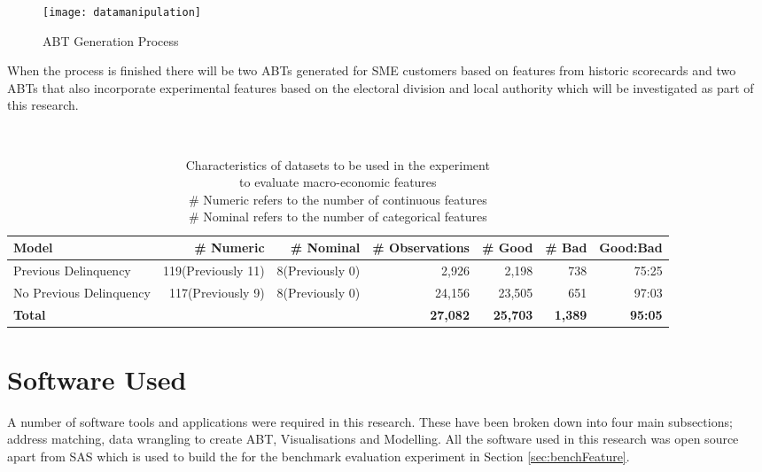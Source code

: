 \begin{figure}[H]
	\texttt{[image: datamanipulation]}
	\caption{ABT Generation Process}
	\label{fig:datamanipulation}
\end{figure}

When the process is finished there will be two ABTs generated for SME customers based on features from historic scorecards and two ABTs that also incorporate experimental features based on the electoral division and local authority which will be investigated as part of this research.

\begin{table}[H]
	\centering\
	\resizebox{\textwidth}{!}
	{
		\begin{tabular}{l r r r r r r}
			\hline
			\textbf{Model} &  \textbf{\# Numeric} & \textbf{\# Nominal} & \textbf{\# Observations} & \textbf{\# Good} & \textbf{\# Bad} & \textbf{Good:Bad}\\
			\hline
			Previous Delinquency & 119(Previously 11) & 8(Previously 0) & 2,926 & 2,198  & 738 & 75:25 \\ 
			No Previous Delinquency & 117(Previously 9)  & 8(Previously 0) & 24,156 & 23,505 & 651  & 97:03 \\ \hline
			\textbf{Total} &  &  & \textbf{27,082} & \textbf{25,703} & \textbf{1,389} & \textbf{95:05} \\ \hline
		\end{tabular}
	}
	\caption{Characteristics of datasets to be used in the experiment \\to evaluate macro-economic features \\
		\# Numeric refers to the number of continuous features \\
		\# Nominal refers to the number of categorical features
	}
	\label{characteristicsMacroDatasets}
\end{table}

\section{Software Used}\label{chp3:softwareUsed}
A number of software tools and applications were required in this research. These have been broken down into four main subsections; address matching, data wrangling to create ABT, Visualisations and Modelling. All the software used in this research was open source apart from SAS which is used to build the for the benchmark evaluation experiment in Section \ref{sec:benchFeature}. 
 

